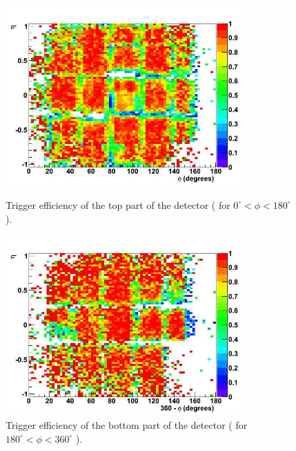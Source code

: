 \begin{figure}[hbtp]
\begin{minipage}{1.0\textwidth}
  \begin{center}
     \includegraphics[width=0.8\textwidth]{eff_eta_phi_top_08}
       \caption{ Trigger efficiency of the top part of the detector (
 for $ 0^\circ < \phi < 180^\circ $ ). 
}
    \label{fig:eff_eta_phi_top_08}
  \end{center}
  \end{minipage}

     \begin{minipage}{1.0\textwidth}
     \begin{center}
      \includegraphics[width=0.8\textwidth]{eff_eta_phi_bot_08}
       \caption{ Trigger efficiency of the bottom part of the detector (
 for $ 180^\circ < \phi < 360^\circ $ ).
}
    \label{fig:eff_eta_phi_bot_08}
  \end{center}
  \end{minipage}
     
\end{figure}

